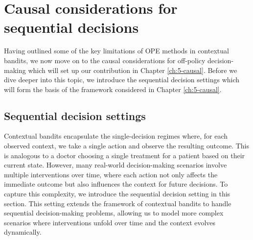 \section{Causal considerations for sequential decisions}
Having outlined some of the key limitations of OPE methods in contextual bandits, we now move on to the causal considerations for off-policy decision-making which will set up our contribution in Chapter \ref*{ch:5-causal}. 
Before we dive deeper into this topic, we introduce the sequential decision settings which will form the basis of the framework considered in Chapter \ref*{ch:5-causal}.

\subsection{Sequential decision settings}
Contextual bandits encapsulate the single-decision regimes where, for each observed context, we take a single action and observe the resulting outcome. This is analogous to a doctor choosing a single treatment for a patient based on their current state. However, many real-world decision-making scenarios involve multiple interventions over time, where each action not only affects the immediate outcome but also influences the context for future decisions. To capture this complexity, we introduce the sequential decision setting in this section. This setting extends the framework of contextual bandits to handle sequential decision-making problems, allowing us to model more complex scenarios where interventions unfold over time and the context evolves dynamically.

